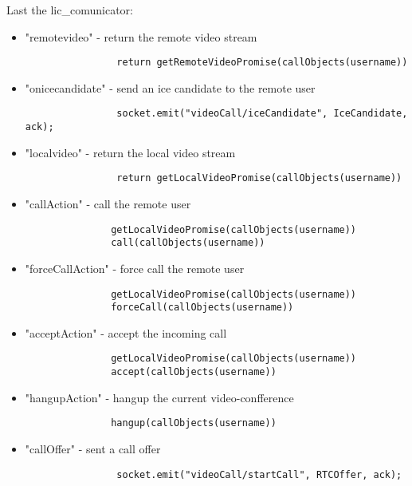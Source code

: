 Last the lic_comunicator:
\begin{itemize}
            \item "remotevideo" - return the remote video stream
            \begin{lstlisting}
                return getRemoteVideoPromise(callObjects(username))
            \end{lstlisting}
            \item "onicecandidate" - send an ice candidate to the remote user
            \begin{lstlisting}
                socket.emit("videoCall/iceCandidate", IceCandidate, ack);
            \end{lstlisting}
            \item "localvideo" - return the local video stream
            \begin{lstlisting}
                return getLocalVideoPromise(callObjects(username))
            \end{lstlisting}
            \item "callAction" - call the remote user
            \begin{lstlisting}
               getLocalVideoPromise(callObjects(username))
               call(callObjects(username))
            \end{lstlisting}
            \item "forceCallAction" - force call the remote user
            \begin{lstlisting}
               getLocalVideoPromise(callObjects(username))
               forceCall(callObjects(username))
            \end{lstlisting}
            \item "acceptAction" - accept the incoming call
            \begin{lstlisting}
               getLocalVideoPromise(callObjects(username))
               accept(callObjects(username))
            \end{lstlisting}
            \item "hangupAction" - hangup the current video-confference
            \begin{lstlisting}
               hangup(callObjects(username))
            \end{lstlisting}
            \item "callOffer" - sent a call offer
            \begin{lstlisting}
                socket.emit("videoCall/startCall", RTCOffer, ack);
            \end{lstlisting}

\end{itemize}
